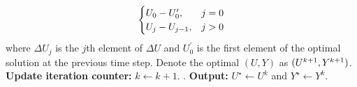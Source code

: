\documentclass{ifacconf}
\begin{document}
\begin{algorithm}[t]
\begin{algorithmic}[1]
\begin{align*}
\begin{alignedat}{2}
\begin{cases}
      U_{0} - \smash{U_{0}^{\prime}}, & j =0
      \\
      U_{j} - U_{j-1}, & j>0
      \end{cases}
      \end{alignedat}
    \end{align*}
    where $\Delta U_{j}$ is the $j$th element of $\Delta U$
    and $U_{0}^{\prime}$ is the first element of the optimal solution at the previous time step. Denote the optimal $(U,Y)$ as $(\smash{U^{k+1}},\smash{Y^{k+1}})$.
    \State \textbf{Update iteration counter:} $k \gets k + 1$.
.
\State \textbf{Output:} $U^\star \gets U^{k}$ and $Y^\star\gets Y^k$.
\end{algorithmic}
\end{algorithm}
\end{document}
